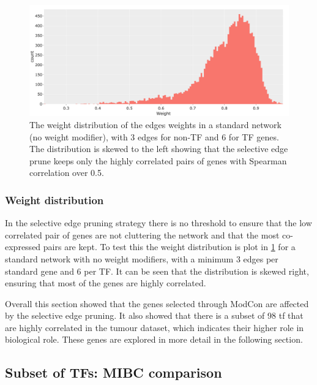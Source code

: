 \begin{figure}[!b]   
\centering
\includegraphics[width=1.0\textwidth,height=1.0\textheight,keepaspectratio]{Sections/Network_I/Resources/selective_pruning/weight_distrib.png}
  \caption{The weight distribution of the edges weights in a standard network (no weight modifier), with 3 edges for non-TF and 6 for TF genes. The distribution is skewed to the left showing that the selective edge prune keeps only the highly correlated pairs of genes with Spearman correlation over 0.5. }
\label{fig:N_I:weight_distrib}
\end{figure}

\subsubsection*{Weight distribution}

In the selective edge pruning strategy there is no threshold to ensure that the low correlated pair of genes are not cluttering the network and that the most co-expressed pairs are kept. To test this the weight distribution is plot in \cref{fig:N_I:weight_distrib} for a standard network with no weight modifiers, with a minimum 3 edges per standard gene and 6 per TF. It can be seen that the distribution is skewed right, ensuring that most of the genes are highly correlated.


Overall this section showed that the genes selected through ModCon are affected by the selective edge pruning. It also showed that there is a subset of 98 \acrlong{tf} that are highly correlated in the tumour dataset, which indicates their higher role in biological role. These genes are explored in more detail in the following section.


\subsection{Subset of TFs: MIBC comparison} \label{s:N_I:sel_tfs_mibc}

